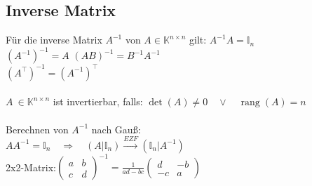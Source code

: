 \documentclass[german, 6pt]{latex4ei/latex4ei_sheet}
\newcommand{\enbrace}[1]{\ensuremath{\left(#1\right)}}
\DeclareMathOperator{\rang}{rang}
\begin{document}
\subsection{Inverse Matrix}
Für die inverse Matrix $A^{-1}$ von $A\in \mathbb K^{n\times n}$ gilt: $A^{-1}A=\mathbb{I}_n$\\
$(A^{-1})^{-1}=A$ \qquad $(AB)^{-1}=B^{-1}A^{-1}$ \\
$(A^\top)^{-1}=(A^{-1})^\top$\\
\\
$A\ \in \mathbb K^{n\times n}$ ist invertierbar, falls: $\det (A) \ne 0 \quad \lor \quad \rang(A)=n$\\
\\
Berechnen von $A^{-1}$ nach Gauß:\\
$AA^{-1}=\mathbb{I}_n\quad\Rightarrow\quad (A|\mathbb{I}_n)\overset{EZF}{\longrightarrow}(\mathbb{I}_n|A^{-1})$\\
2x2-Matrix:$\enbrace{\begin{matrix}
a & b \\
c & d
\end{matrix}}^{-1} = \frac{1}{ad-bc}\begin{pmatrix}
d & -b \\
-c & a
\end{pmatrix}$
\end{document}
